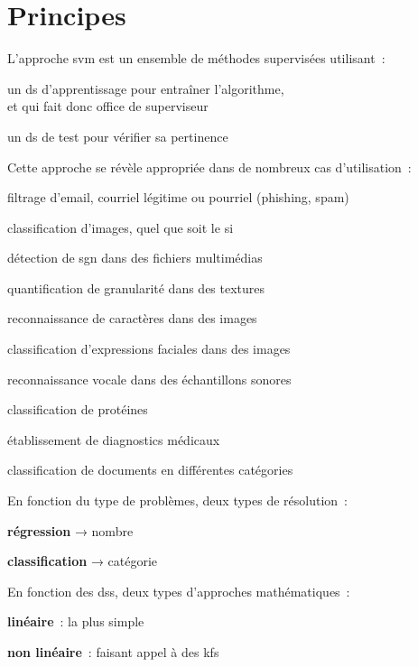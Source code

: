 \section{Principes}

L’approche \gls{svm} est un ensemble de méthodes supervisées utilisant :
\begin{enum}
\item{un \gls{ds} d’apprentissage pour entraîner l’algorithme,\\
et qui fait donc office de superviseur}
\item{un \gls{ds} de test pour vérifier sa pertinence}
\end{enum}

Cette approche se révèle appropriée dans de nombreux cas d’utilisation :
\begin{itmz}
\item{filtrage d’email, courriel légitime ou pourriel (phishing, spam)}
\item{classification d’images, quel que soit le \gls{si}}
\item{détection de \gls{sgn} dans des fichiers multimédias}
\item{quantification de granularité dans des textures}
\item{reconnaissance de caractères dans des images}
\item{classification d’expressions faciales dans des images}
\item{reconnaissance vocale dans des échantillons sonores}
\item{classification de protéines}
\item{établissement de diagnostics médicaux}
\item{classification de documents en différentes catégories}
\end{itmz}

En fonction du type de problèmes, deux types de résolution :
\begin{itmz}
\item{\textbf{régression} → nombre}
\item{\textbf{classification} → catégorie}
\end{itmz}

En fonction des \glspl{ds}, deux types d’approches mathématiques :
\begin{itmz}
\item{\textbf{linéaire} : la plus simple}
\item{\textbf{non linéaire} : faisant appel à des \glspl{kf}}
\end{itmz}

